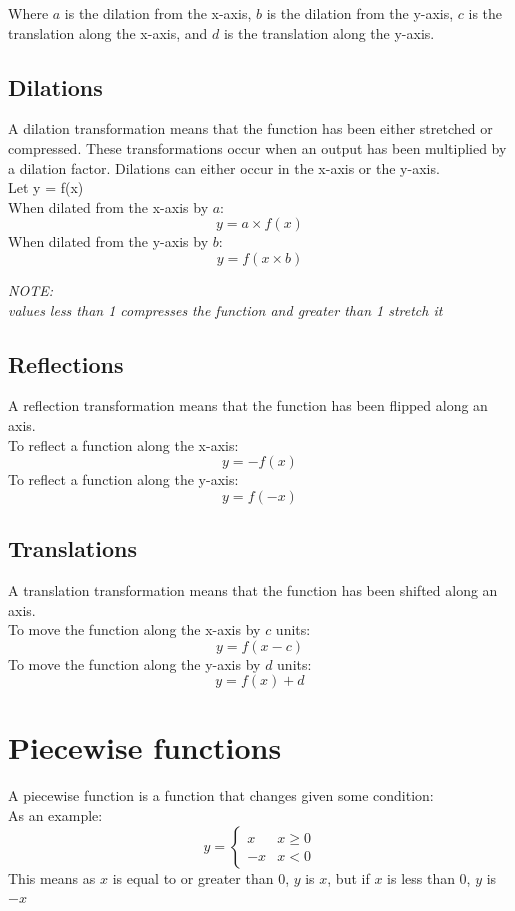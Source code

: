 \documentclass{book}
\newenvironment{note}{\begin{center}\em NOTE:\\}{\end{center}}
\begin{document}
Where $a$ is the dilation from the x-axis, $b$ is the dilation from the y-axis, $c$ is the translation along the x-axis, and $d$ is the translation along the y-axis.

\section{Dilations}
A dilation transformation means that the function has been either stretched or compressed.  These transformations occur when an output has been multiplied by a dilation factor.  Dilations can either occur in the x-axis or the y-axis.\\
Let y = f(x)\\
When dilated from the x-axis by $a$:
\[
	y = a \times f(x)
\]
When dilated from the y-axis by $b$:
\[
	y = f(x \times b)
\]
\begin{note}
	values less than 1 compresses the function and greater than 1 stretch it
\end{note}

\section{Reflections}
A reflection transformation means that the function has been flipped along an axis.\\
To reflect a function along the x-axis:
\[
	y = -f(x)
\]
To reflect a function along the y-axis:
\[
	y = f(-x)
\]

\section{Translations}
A translation transformation means that the function has been shifted along an axis.\\
To move the function along the x-axis by $c$ units:
\[
	y = f(x - c)
\]
To move the function along the y-axis by $d$ units:
\[
	y = f(x) + d
\]

\chapter{Piecewise functions}
A piecewise function is a function that changes given some condition:\\
As an example:
\[
	y = \begin{cases}
		x  & x \geq 0 \\
		-x & x < 0
	\end{cases}
\]
This means as $x$ is equal to or greater than 0, $y$ is $x$, but if $x$ is less than 0, $y$ is $-x$
\end{document}
